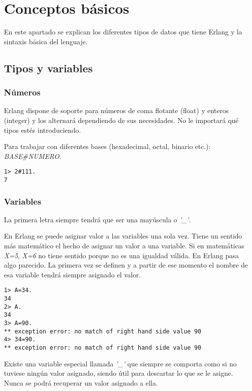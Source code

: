 \section{Conceptos básicos}

En este apartado se explican los diferentes tipos de datos que tiene Erlang y la sintaxis básica del lenguaje.


\subsection{Tipos y variables}

\subsubsection{Números}

Erlang dispone de soporte para números de coma flotante (float) y enteros (integer) y los alternará
dependiendo de sus necesidades. No le importará qué tipos estés introduciendo.

Para trabajar con diferentes bases (hexadecimal, octal, binario etc.): \textit{BASE\#NUMERO}.
\begin{lstlisting}
1> 2#111.
7
\end{lstlisting}

\subsubsection{Variables}

La primera letra siempre tendrá que ser una mayúscula o \textit{'_'}.

En Erlang se puede asignar valor a las variables una sola vez. Tiene un sentido más matemático el hecho de
asignar un valor a una variable. Si en matemáticas \textit{X=5}, \textit{X=6} no tiene sentido porque no es
una igualdad válida. En Erlang pasa algo parecido. La primera vez se definen y a partir de ese momento el
nombre de esa variable tendrá siempre asignado el valor.

\begin{lstlisting}
1> A=34.
34
2> A.
34
3> A=90.
** exception error: no match of right hand side value 90
4> 34=90.
** exception error: no match of right hand side value 90
\end{lstlisting}

Existe una variable especial llamada \textit{'_'} que siempre se comporta como si no tuviese ningún valor
asignado, siendo útil para descartar lo que se le asigne. Nunca se podrá recuperar un valor asignado a ella.

